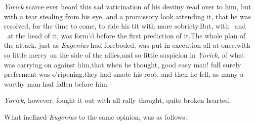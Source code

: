 \documentclass{article}
\begin{document}
\textit{Yorick} scarce ever heard this sad va\-ticination of his
destiny read over to him, but with a tear stealing from his eye,
and a promissory look attending it, that he was resolved, for the
time to come, to ride his tit with more sobriety.\tsh But,
with \astv\ and \astv\ at the 
head of it, was form’d before the first prediction of it.\tsk The
whole plan of the attack, just as \textit{Eugenius} had foreboded,
was put in execution all at once,\tsk with so little mercy on the side of the allies,\tsk and so little
suspicion in \textit{Yorick}, of what was carrying on against
him,\tsk that when he thought, good easy man! full surely
preferment was o’ripening,\tsk they had smote his root, and
then he fell, as many a worthy man had fallen before him.

\textit{Yorick}, however, fought it out with all
rally thought, quite broken hearted.

What inclined \textit{Eugenius} to the same opinion, was as
follows:
\end{document}
